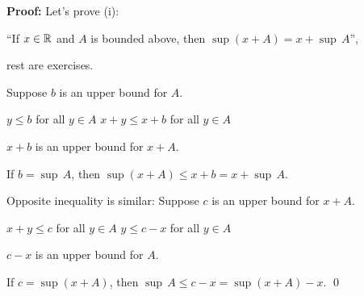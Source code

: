 \documentclass[10pt,aspectratio=169]{beamer}
\begin{document}
\begin{frame}

\textbf{Proof:}
Let's prove (i):

``If $x \in {\mathbb{R}}$ and $A$ is bounded above, then $\sup (x+A) = x
+ \sup\, A$'',

rest are exercises.

\medskip
\pause

Suppose $b$ is an upper bound for $A$.

\medskip
\pause

\thus \quad
$y \leq b$ for all $y \in A$
\wthus
$x+y \leq x+b$ for all $y \in A$

\medskip
\pause

\thus \quad $x+b$ is an upper bound for $x+A$.

\medskip
\pause

If $b = \sup\, A$, then
\quad
$\sup (x+A) \leq x+b = x+ \sup\, A$.

\medskip
\pause

Opposite inequality is similar:
\quad
\pause
Suppose $c$ is an upper bound for $x+A$.

\medskip
\pause

\thus \quad $x+y \leq c$ for all $y \in A$
\pause
\wthus
$y \leq c-x$ for all $y \in A$

\medskip
\pause

\thus \quad
$c-x$ is an upper bound for $A$.

\medskip
\pause

If $c = \sup (x+A)$, then \quad
$\sup\, A \leq c-x = \sup (x+A) -x$.
\qed

\end{frame}
\end{document}
